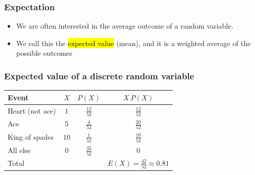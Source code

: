\begin{frame}
\frametitle{Expectation}

\begin{itemize}

\item We are often interested in the average outcome of a random variable.

\item We call this the \hl{expected value} (mean), and it is a weighted average of the possible outcomes
\formula{\[\mu = E(X) = \sum_{i = 1}^k x_i ~ P(X = x_i)\]}

\end{itemize}

\end{frame}


\begin{frame}
\frametitle{Expected value of a discrete random variable}


\pause

\begin{center}
\renewcommand{\arraystretch}{1.5}
\begin{tabular}{l | c | c | c }
Event		& $X$ 		& $P(X)$        		& $X ~ P(X)$ \\
\hline
Heart (not ace)	& $1$		& $\frac{12}{52}$	& $\frac{12}{52}$ \\
Ace			& $5$		& $\frac{4}{52}$	& $\frac{20}{52}$ \\	
King of spades	& $10$		& $\frac{1}{52}$	& $\frac{10}{52}$ \\	
All else		& $0$		& $\frac{35}{52}$	& $0$ \\
\hline
Total			&			&				& $E(X) = \frac{42}{52} \approx 0.81$
\end{tabular}

\end{center}

\end{frame}


